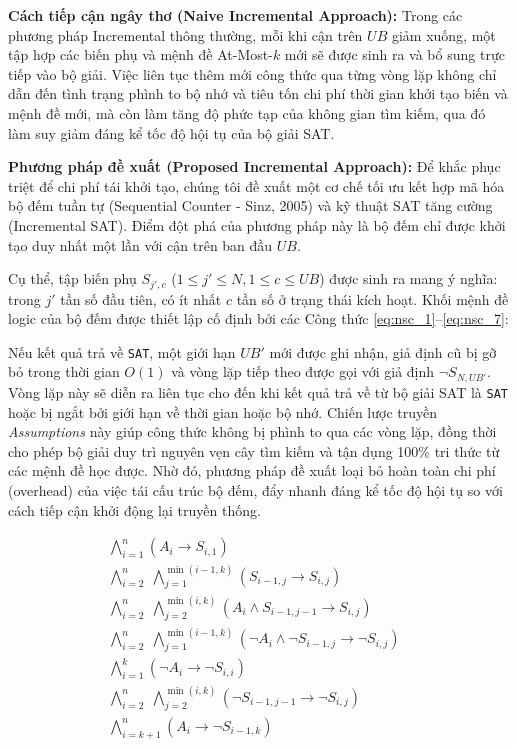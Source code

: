 \documentclass[letterpaper,journal]{IEEEtran}
\begin{document}
\textbf{Cách tiếp cận ngây thơ (Naive Incremental Approach):} 
Trong các phương pháp Incremental thông thường, mỗi khi cận trên $UB$ giảm xuống, một tập hợp các biến phụ và mệnh đề At-Most-$k$ mới sẽ được sinh ra và bổ sung trực tiếp vào bộ giải. Việc liên tục thêm mới công thức qua từng vòng lặp không chỉ dẫn đến tình trạng phình to bộ nhớ và tiêu tốn chi phí thời gian khởi tạo biến và mệnh đề mới, mà còn làm tăng độ phức tạp của không gian tìm kiếm, qua đó làm suy giảm đáng kể tốc độ hội tụ của bộ giải SAT.


\textbf{Phương pháp đề xuất (Proposed Incremental Approach):} 
Để khắc phục triệt để chi phí tái khởi tạo, chúng tôi đề xuất một cơ chế tối ưu kết hợp mã hóa bộ đếm tuần tự (Sequential Counter - Sinz, 2005) và kỹ thuật SAT tăng cường (Incremental SAT). Điểm đột phá của phương pháp này là bộ đếm chỉ được khởi tạo duy nhất một lần với cận trên ban đầu $UB$. 

Cụ thể, tập biến phụ $S_{j',c}$ ($1 \le j' \le N, 1 \le c \le UB$) được sinh ra mang ý nghĩa: trong $j'$ tần số đầu tiên, có ít nhất $c$ tần số ở trạng thái kích hoạt. Khối mệnh đề logic của bộ đếm được thiết lập cố định bởi các Công thức \eqref{eq:nsc_1}--\eqref{eq:nsc_7}:

Nếu kết quả trả về \texttt{SAT}, một giới hạn $UB'$ mới được ghi nhận, giả định cũ bị gỡ bỏ trong thời gian $O(1)$ và vòng lặp tiếp theo được gọi với giả định $\neg S_{N, UB'}$. Vòng lặp này sẽ diễn ra liên tục cho đến khi kết quả trả về từ bộ giải SAT là \texttt{SAT} hoặc bị ngắt bởi giới hạn về thời gian hoặc bộ nhớ. Chiến lược truyền \textit{Assumptions} này giúp công thức không bị phình to qua các vòng lặp, đồng thời cho phép bộ giải duy trì nguyên vẹn cây tìm kiếm và tận dụng 100\% tri thức từ các mệnh đề học được. Nhờ đó, phương pháp đề xuất loại bỏ hoàn toàn chi phí (overhead) của việc tái cấu trúc bộ đếm, đẩy nhanh đáng kể tốc độ hội tụ so với cách tiếp cận khởi động lại truyền thống.

\begin{align}
    &\bigwedge_{i=1}^{n}
    \left( A_i \rightarrow S_{i,1} \right)
    \label{eq:nsc_1}
    && \\
    &\bigwedge_{i=2}^{n}
    \;\bigwedge_{j=1}^{\min(i-1,k)}
    \left( S_{i-1,j} \rightarrow S_{i,j} \right)
    \label{eq:nsc_2}
    && \\
    &\bigwedge_{i=2}^{n}
    \;\bigwedge_{j=2}^{\min(i,k)}
    \left( A_i \land S_{i-1,j-1} \rightarrow S_{i,j} \right)
    \label{eq:nsc_3}
    && \\
    &\bigwedge_{i=2}^{n}
    \;\bigwedge_{j=1}^{\min(i-1,k)}
    \left( \neg A_i \land \neg S_{i-1,j} \rightarrow \neg S_{i,j} \right)
    \label{eq:nsc_4}
    && \\
    &\bigwedge_{i=1}^{k}
    \left( \neg A_i \rightarrow \neg S_{i,i} \right)
    \label{eq:nsc_5}
    && \\
    &\bigwedge_{i=2}^{n}
    \;\bigwedge_{j=2}^{\min(i,k)}
    \left( \neg S_{i-1,j-1} \rightarrow \neg S_{i,j} \right)
    \label{eq:nsc_6}
    && \\
    &\bigwedge_{i=k+1}^{n}
    \left( A_i \rightarrow \neg S_{i-1,k} \right)
    \label{eq:nsc_7}
    && \\
\end{align}
\end{document}
